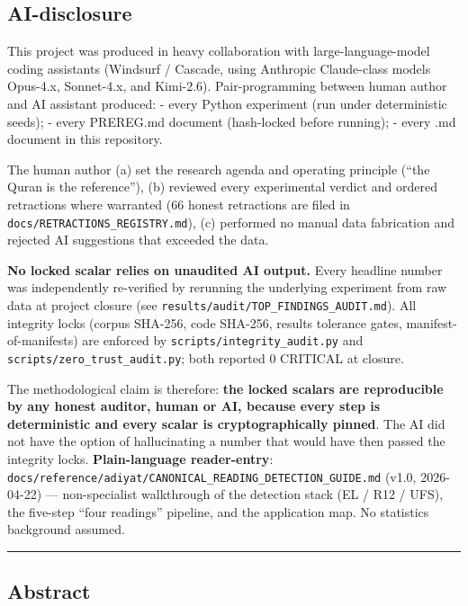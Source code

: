 \documentclass[
]{article}
\begin{document}
\subsection{AI-disclosure}\label{ai-disclosure}

This project was produced in heavy collaboration with
large-language-model coding assistants (Windsurf / Cascade, using
Anthropic Claude-class models Opus-4.x, Sonnet-4.x, and Kimi-2.6).
Pair-programming between human author and AI assistant produced: - every
Python experiment (run under deterministic seeds); - every PREREG.md
document (hash-locked before running); - every .md document in this
repository.

The human author (a) set the research agenda and operating principle
(``the Quran is the reference''), (b) reviewed every experimental
verdict and ordered retractions where warranted (66 honest retractions
are filed in \texttt{docs/RETRACTIONS\_REGISTRY.md}), (c) performed no
manual data fabrication and rejected AI suggestions that exceeded the
data.

\textbf{No locked scalar relies on unaudited AI output.} Every headline
number was independently re-verified by rerunning the underlying
experiment from raw data at project closure (see
\texttt{results/audit/TOP\_FINDINGS\_AUDIT.md}). All integrity locks
(corpus SHA-256, code SHA-256, results tolerance gates,
manifest-of-manifests) are enforced by
\texttt{scripts/integrity\_audit.py} and
\texttt{scripts/zero\_trust\_audit.py}; both reported 0 CRITICAL at
closure.

The methodological claim is therefore: \textbf{the locked scalars are
reproducible by any honest auditor, human or AI, because every step is
deterministic and every scalar is cryptographically pinned}. The AI did
not have the option of hallucinating a number that would have then
passed the integrity locks. \textbf{Plain-language reader-entry}:
\texttt{docs/reference/adiyat/CANONICAL\_READING\_DETECTION\_GUIDE.md}
(v1.0, 2026-04-22) --- non-specialist walkthrough of the detection stack
(EL / R12 / UFS), the five-step ``four readings'' pipeline, and the
application map. No statistics background assumed.

\begin{center}\rule{0.5\linewidth}{0.5pt}\end{center}

\subsection{Abstract}\label{abstract}
\end{document}
